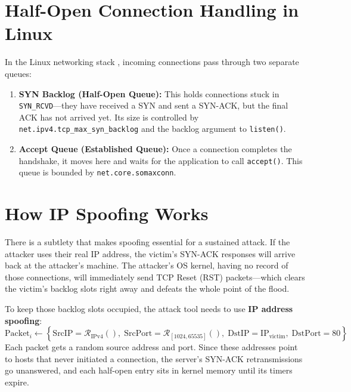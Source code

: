 \documentclass[11pt,a4paper]{report}
\begin{document}
\section{Half-Open Connection Handling in Linux}
In the Linux networking stack \cite{linux_kernel}, incoming connections pass through two separate queues:
\begin{enumerate}
    \item \textbf{SYN Backlog (Half-Open Queue):} This holds connections stuck in \texttt{SYN\_RCVD}---they have received a SYN and sent a SYN-ACK, but the final ACK has not arrived yet. Its size is controlled by \texttt{net.ipv4.tcp\_max\_syn\_backlog} and the backlog argument to \texttt{listen()}.
    \item \textbf{Accept Queue (Established Queue):} Once a connection completes the handshake, it moves here and waits for the application to call \texttt{accept()}. This queue is bounded by \texttt{net.core.somaxconn}.
\end{enumerate}



\section{How IP Spoofing Works}
There is a subtlety that makes spoofing essential for a sustained attack. If the attacker uses their real IP address, the victim's SYN-ACK responses will arrive back at the attacker's machine. The attacker's OS kernel, having no record of those connections, will immediately send TCP Reset (RST) packets---which clears the victim's backlog slots right away and defeats the whole point of the flood.

To keep those backlog slots occupied, the attack tool needs to use \textbf{IP address spoofing}:
\begin{equation}
    \text{Packet}_{i} \leftarrow \left\{ \text{SrcIP} = \mathcal{R}_{\text{IPv4}}(), \; \text{SrcPort} = \mathcal{R}_{[1024, 65535]}(), \; \text{DstIP} = \text{IP}_{\text{victim}}, \; \text{DstPort} = 80 \right\}
\end{equation}
Each packet gets a random source address and port. Since these addresses point to hosts that never initiated a connection, the server's SYN-ACK retransmissions go unanswered, and each half-open entry sits in kernel memory until its timers expire.

\end{document}
